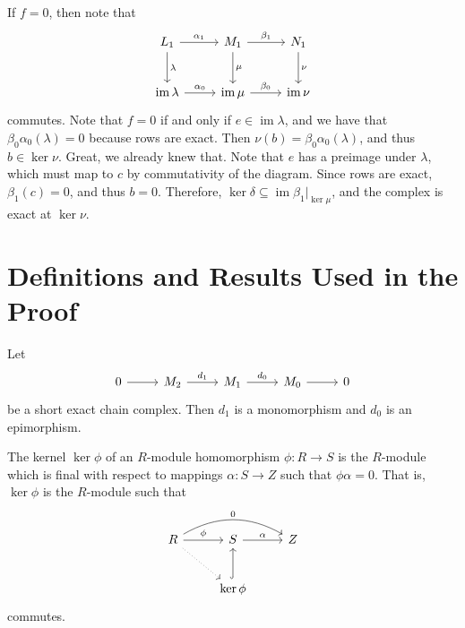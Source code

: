 \documentclass[11pt, letterpaper]{article}
\DeclareMathOperator{\im}{im}
\renewenvironment{proof}[1][]{\begin{replacementproof2}}{\end{replacementproof2}}
\begin{document}
\begin{proof}
If $f=0$, then note that
\[\begin{tikzcd}[row sep = 2.5em, column sep = 2.5em]
	L_1\arrow[r, "\alpha _1"]\arrow[d, "\lambda "]&M_1\arrow[r, "\beta _1"]\arrow[d, "\mu "]&N_1\arrow[d, "\nu "]\\
	\im \lambda \arrow[r, "\alpha _0"]&\im \mu \arrow[r, "\beta _0"]&\im \nu 
\end{tikzcd}\]
commutes. Note that $f=0$ if and only if $e\in \im \lambda $, and we have that $\beta_0\alpha _0(\lambda )=0$ because rows are exact. Then $\nu (b)=\beta_0\alpha_0(\lambda )$, and thus $b\in \ker \nu $. Great, we already knew that. Note that $e$ has a preimage under $\lambda $, which must map to $c$ by commutativity of the diagram. Since rows are exact, $\beta_1(c)=0$, and thus $b=0$. Therefore, $\ker \delta \subseteq \im \beta_1|_{\ker \mu }$, and the complex is exact at $\ker \nu $.
\end{proof}
\appendix
\section{Definitions and Results Used in the Proof}
\begin{lemma}\label{lma:1}
	Let
	\[\begin{tikzcd}[row sep = 2.5em, column sep = 2.5em]
		0\arrow[r]&M_2\arrow[r, "d_1"]&M_1\arrow[r, "d_0"]&M_0\arrow[r]&0
	\end{tikzcd}\]
	be a short exact chain complex. Then $d_1$ is a monomorphism and $d_0$ is an epimorphism.
\end{lemma}
\begin{definition}[Kernel]\label{dfn:1}
	The kernel $\ker \phi $ of an $R$-module homomorphism $\phi : R \to S$ is the $R$-module which is final with respect to mappings $\alpha : S \to Z$ such that $\phi \alpha =0$. That is, $\ker \phi $ is the $R$-module such that
	\[\begin{tikzcd}[row sep = 2.5em, column sep = 2.5em]
		R\arrow[rr, bend left, "0"]\arrow[dr, dotted]\arrow[r, "\phi "]&S\arrow[r, "\alpha "]&Z\\
									       &\ker \phi \arrow[u, hook]
	\end{tikzcd}\]
	commutes.
\end{definition}
\end{document}
